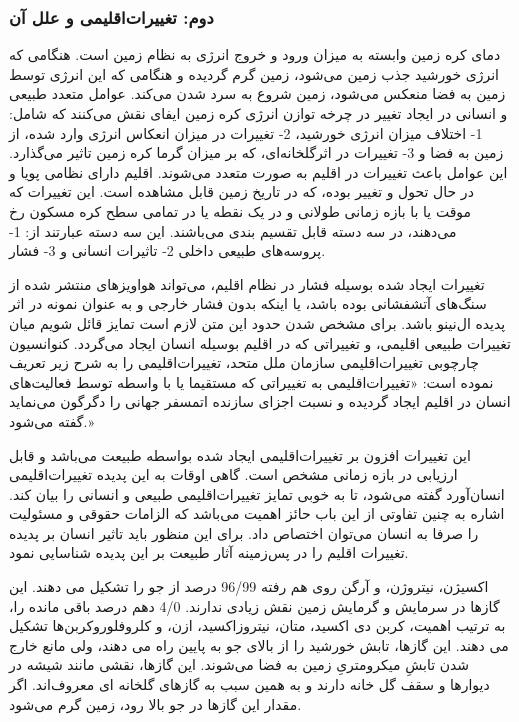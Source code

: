 		\subsubsection*{ دوم: تغییرات‌اقلیمی و علل آن}
		دمای کره زمین وابسته به میزان ورود و خروج انرژی به نظام زمین است. هنگامی که انرژی خورشید جذب زمین می‌شود، زمین گرم گردیده و هنگامی که این انرژی توسط زمین به فضا منعکس می‌شود، زمین شروع به سرد شدن می‌کند. عوامل متعدد طبیعی و انسانی در ایجاد تغییر در چرخه توازن انرژی کره زمین ایفای نقش می‌کنند که شامل: 1- اختلاف میزان انرژی خورشید، 2- تغییرات در میزان انعکاس انرژی وارد شده، از زمین به فضا و 3- تغییرات در اثر‌گلخانه‌ای، که بر میزان گرما کره زمین تاثیر می‌گذارد. این عوامل باعث تغییرات در اقلیم به صورت متعدد می‌شوند.
		اقلیم دارای نظامی پویا و در حال تحول و تغییر بوده، که در تاریخ زمین قابل مشاهده است. این تغییرات که موقت یا با بازه زمانی طولانی و در یک نقطه یا در تمامی سطح کره مسکون رخ می‌دهند، در سه دسته قابل تقسیم بندی می‌باشند. این سه دسته عبارتند از: 1- پروسه‌های طبیعی داخلی 2- تاثیرات انسانی و 3- فشار.
		
		تغییرات ایجاد شده بوسیله فشار در نظام اقلیم، می‌تواند هواویز‌های منتشر شده از سنگ‌های آتشفشانی بوده باشد، یا اینکه بدون فشار خارجی و  به عنوان نمونه در اثر پدیده ال‌نینو باشد. برای مشخص شدن حدود این متن لازم است تمایز قائل شویم میان تغییرات طبیعی اقلیمی، و تغییراتی که در اقلیم بوسیله انسان ایجاد می‌گردد. کنوانسیون چارچوبی تغییرات‌اقلیمی سازمان ملل متحد، تغییرات‌اقلیمی را به شرح زیر تعریف نموده است: «تغییرات‌اقلیمی به تغییراتی که مستقیما یا با واسطه توسط فعالیت‌های انسان در اقلیم ایجاد گردیده و نسبت اجزای سازنده اتمسفر جهانی را دگرگون می‌نماید گفته می‌شود.»
		
		این تغییرات افزون بر تغییرات‌اقلیمی ایجاد شده بواسطه طبیعت می‌باشد و قابل ارزیابی در بازه زمانی مشخص است. گاهی اوقات به این پدیده تغییرات‌اقلیمی انسان‌آورد گفته می‌شود، تا به خوبی تمایز تغییرات‌اقلیمی طبیعی و انسانی را بیان کند. اشاره به چنین تفاوتی از این باب حائز اهمیت می‌باشد که الزامات حقوقی و مسئولیت را صرفا به انسان می‌توان اختصاص داد. برای این منظور باید تاثیر انسان بر پدیده تغییرات اقلیم را در پس‌زمینه آثار طبیعت بر این پدیده شناسایی نمود.  
		
		اكسیژن، نیتروژن، و آرگن روی هم رفته 96/99 درصد از جو را تشكیل مى دهند. این گازها در سرمایش و گرمایش زمین نقش زیادى ندارند. 4/0 دهم درصد باقى مانده را، به ترتیب اهمیت، كربن دى اكسید، متان، نیتروزاكسید، ازن، و كلروفلوروكربن‌ها تشكیل مى دهند. این گازها، تابش خورشید را از بالاى جو به پایین راه مى دهند، ولى مانع خارج شدن تابشِ میكرومترىِ زمین به فضا می‌شوند. این گازها، نقشى مانند شیشه در دیوارها و سقف گل خانه دارند و به همین سبب به گازهاى گلخانه اى معروف‌اند. اگر مقدار این گازها در جو بالا رود، زمین گرم می‌شود.
		
